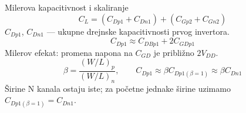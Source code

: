 \begin{frame}[label=09_3-s010]{Milerova kapacitivnost i skaliranje}
\[C_L=(C_{Dp1}+C_{Dn1})+(C_{Gp2}+C_{Gn2})\]
$C_{Dp1}$, $C_{Dn1}$ — ukupne drejnske kapacitivnosti prvog invertora.
\[C_{Dp1}\approx C_{DBp1}+2C_{GDp1}\]
\alert{Milerov efekat:} promena napona na $C_{GD}$ je približno $2V_{DD}$.
\[\beta=\frac{(W/L)_p}{(W/L)_n},\qquad
 C_{Dp1}\approx\beta C_{Dp1(\beta=1)}\approx\beta C_{Dn1}\]
Širine N kanala ostaju iste; za početne jednake širine uzimamo $C_{Dp1(\beta=1)}=C_{Dn1}$.
\end{frame}
